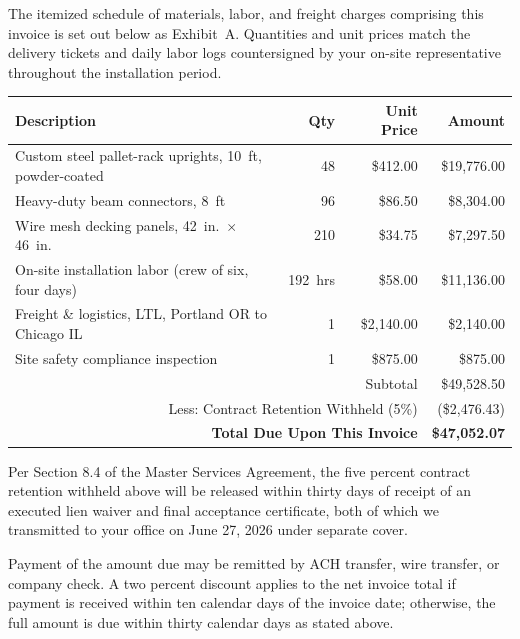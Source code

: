 \documentclass[11pt,a4paper,addressstd]{dinbrief}
\begin{document}
\begin{letter}
The itemized schedule of materials, labor, and freight charges comprising this
invoice is set out below as Exhibit~A. Quantities and unit prices match the
delivery tickets and daily labor logs countersigned by your on-site
representative throughout the installation period.

\begin{tcolorbox}[
  colback=white,
  colframe=meridianNavy,
  boxrule=0.8pt,
  arc=1.5mm,
  left=3mm,right=3mm,top=2.5mm,bottom=2.5mm,
  colbacktitle=meridianNavy,
  coltitle=white,
  fonttitle=\sffamily\bfseries,
  title=Exhibit A --- Itemized Schedule of Charges
]
\begin{tabular}{@{}p{7.3cm}rrr@{}}
\hline
\textcolor{meridianNavy}{\textbf{Description}} & \textcolor{meridianNavy}{\textbf{Qty}} & \textcolor{meridianNavy}{\textbf{Unit Price}} & \textcolor{meridianNavy}{\textbf{Amount}}\\
\hline
Custom steel pallet-rack uprights, 10~ft, powder-coated & 48 & \$412.00 & \$19,776.00\\
Heavy-duty beam connectors, 8~ft & 96 & \$86.50 & \$8,304.00\\
Wire mesh decking panels, 42~in.\ $\times$ 46~in. & 210 & \$34.75 & \$7,297.50\\
On-site installation labor (crew of six, four days) & 192~hrs & \$58.00 & \$11,136.00\\
Freight \& logistics, LTL, Portland OR to Chicago IL & 1 & \$2,140.00 & \$2,140.00\\
Site safety compliance inspection & 1 & \$875.00 & \$875.00\\
\hline
\multicolumn{3}{r}{Subtotal} & \$49,528.50\\
\multicolumn{3}{r}{Less: Contract Retention Withheld (5\%)} & (\$2,476.43)\\
\hline
\multicolumn{3}{r}{\textbf{Total Due Upon This Invoice}} & \textcolor{meridianGold}{\textbf{\$47,052.07}}\\
\hline
\end{tabular}
\end{tcolorbox}

Per Section 8.4 of the Master Services Agreement, the five percent contract
retention withheld above will be released within thirty days of receipt of an
executed lien waiver and final acceptance certificate, both of which we
transmitted to your office on June 27, 2026 under separate cover.

Payment of the amount due may be remitted by ACH transfer, wire transfer, or
company check. A two percent discount applies to the net invoice total if
payment is received within ten calendar days of the invoice date; otherwise,
the full amount is due within thirty calendar days as stated above.


\end{letter}
\end{document}
